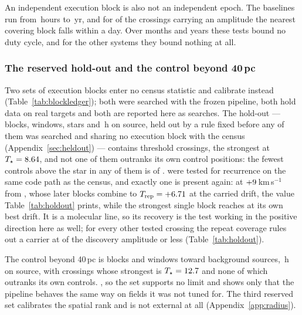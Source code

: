 An independent execution block is also not an independent epoch. The
baselines run from \RcSepMinH\,hours to \RcSepMaxYr\,yr, and for
\RcNSepSameDay{} of the \RcNExclPoss{} crossings carrying an amplitude the
nearest covering block falls within a day. Over months and years these tests
bound no duty cycle, and for the other \RcNoRepSys{} systems they bound
nothing at all.

\subsubsection{The reserved hold-out and the control beyond 40\,pc}
\label{sec:holdoutsearch}

Two sets of execution blocks enter no census statistic and calibrate instead
(Table~\ref{tab:blockledger}); both were searched with the frozen pipeline,
both hold data on real targets and both are reported here as searches. The hold-out --- \HoNBlock{}
blocks, \HoNWin{} windows, \HoNStar{} stars and \HoHours\,h on source,
held out by a rule fixed before any of them was searched and sharing no execution
block with the census (Appendix~\ref{sec:heldout}) --- contains \HoNCross{}
threshold crossings, the strongest at $T_\star=8.64$, and not one of them
outranks its own control positions: the fewest controls above the star in any
of them is \HoNCtrlMin{} of \NCtrl. \HoNTested{} were tested for recurrence on the same
code path as the census, and exactly one is present again: \HoRecStar{} at
$+9$\,km\,s$^{-1}$ from \HoRecLine, whose \HoRecNRep{} later blocks
combine to $T_{\rm rep}=+6.71$ at the carried drift, the value
Table~\ref{tab:holdout} prints, while the strongest single block reaches
\HoRecTAnyDrift{} at its own best drift. It is a molecular line, so its
recovery is the test working in the positive direction here as well; for
every other tested crossing the repeat coverage rules out a carrier at
\HoFracMax{} of the discovery amplitude or less (Table~\ref{tab:holdout}).

The control beyond 40\,pc is \OosNBlock{} blocks and \OosNWin{} windows toward
\OosNStar{} background sources, \OosHours\,h on source, with \OosNCross{}
crossings whose strongest is $T_\star=12.7$ and none of which outranks its
own controls. \OosVsysClause, so the set supports no limit and shows only that
the pipeline behaves the same way on fields it was not tuned for. The third reserved set calibrates the spatial rank
and is not external at all (Appendix~\ref{app:radius}).

